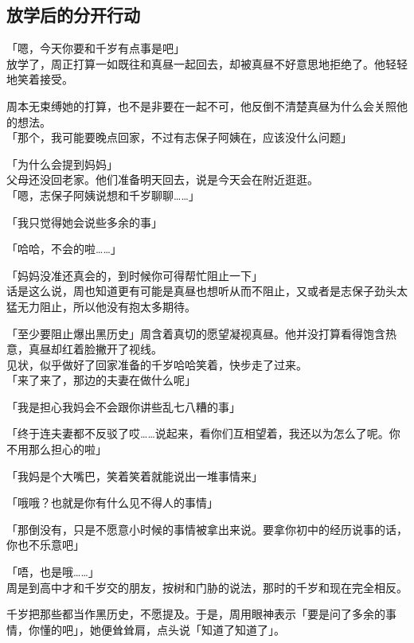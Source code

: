 \subsection{放学后的分开行动}

「嗯，今天你要和千岁有点事是吧」\\

放学了，周正打算一如既往和真昼一起回去，却被真昼不好意思地拒绝了。他轻轻地笑着接受。

周本无束缚她的打算，也不是非要在一起不可，他反倒不清楚真昼为什么会关照他的想法。\\

「那个，我可能要晚点回家，不过有志保子阿姨在，应该没什么问题」

「为什么会提到妈妈」\\

父母还没回老家。他们准备明天回去，说是今天会在附近逛逛。\\

「嗯，志保子阿姨说想和千岁聊聊……」

「我只觉得她会说些多余的事」

「哈哈，不会的啦……」

「妈妈没准还真会的，到时候你可得帮忙阻止一下」\\

话是这么说，周也知道更有可能是真昼也想听从而不阻止，又或者是志保子劲头太猛无力阻止，所以他没有抱太多期待。

「至少要阻止爆出黑历史」周含着真切的愿望凝视真昼。他并没打算看得饱含热意，真昼却红着脸撇开了视线。\\

见状，似乎做好了回家准备的千岁哈哈笑着，快步走了过来。\\

「来了来了，那边的夫妻在做什么呢」

「我是担心我妈会不会跟你讲些乱七八糟的事」

「终于连夫妻都不反驳了哎……说起来，看你们互相望着，我还以为怎么了呢。你不用那么担心的啦」

「我妈是个大嘴巴，笑着笑着就能说出一堆事情来」

「哦哦？也就是你有什么见不得人的事情」

「那倒没有，只是不愿意小时候的事情被拿出来说。要拿你初中的经历说事的话，你也不乐意吧」

「唔，也是哦……」\\

周是到高中才和千岁交的朋友，按树和门胁的说法，那时的千岁和现在完全相反。

千岁把那些都当作黑历史，不愿提及。于是，周用眼神表示「要是问了多余的事情，你懂的吧」，她便耸耸肩，点头说「知道了知道了」。\\

